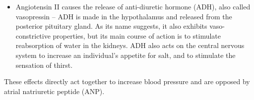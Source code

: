 \begin{itemize}
\item
  Angiotensin II causes the release of anti-diuretic hormone (ADH), also called vasopressin -- ADH is made in the hypothalamus and released from the posterior pituitary gland. As its name suggests, it also exhibits vaso-constrictive properties, but its main course of action is to stimulate reabsorption of water in the kidneys. ADH also acts on the central nervous system to increase an individual's appetite for salt, and to stimulate the sensation of thirst.
\end{itemize}

These effects directly act together to increase blood pressure and are opposed by atrial natriuretic peptide (ANP).


